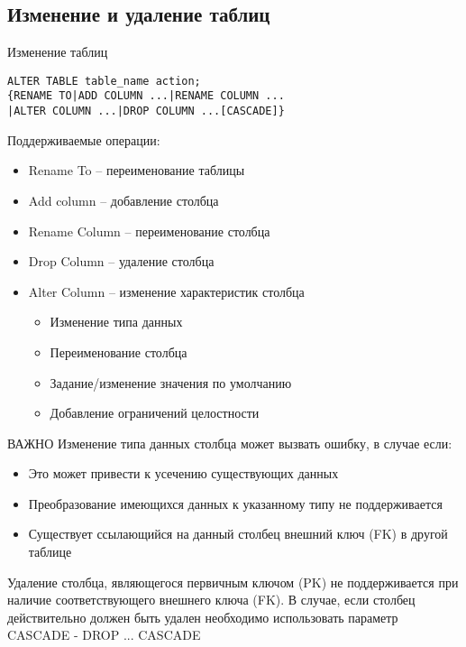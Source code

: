 \documentclass[12pt]{article}
\begin{document}
\newpage 

\subsection{Изменение и удаление таблиц}

\begin{nota}{Изменение таблиц}
\begin{lstlisting}
ALTER TABLE table_name action;
{RENAME TO|ADD COLUMN ...|RENAME COLUMN ...
|ALTER COLUMN ...|DROP COLUMN ...[CASCADE]}
\end{lstlisting}

    Поддерживаемые операции: 

    \begin{itemize}
        \item Rename To -- переименование таблицы
        \item Add column -- добавление столбца
        \item Rename Column -- переименование столбца
        \item Drop Column -- удаление столбца
        \item Alter Column -- изменение характеристик столбца 
        
        \begin{itemize}
            \item Изменение типа данных 
            \item Переименование столбца 
            \item Задание/изменение значения по умолчанию 
            \item Добавление ограничений целостности 
        \end{itemize}
    \end{itemize}
\end{nota}

\begin{Remark}{ВАЖНО}
    Изменение типа данных столбца может вызвать ошибку, в случае если:

    \begin{itemize}
        \item Это может привести к усечению существующих данных
        \item Преобразование имеющихся данных к указанному типу не поддерживается 
        \item Существует ссылающийся на данный столбец внешний ключ (FK) в другой таблице 
    \end{itemize}

    Удаление столбца, являющегося первичным ключом (PK) не поддерживается при наличие соответствующего внешнего ключа (FK). В случае, если столбец действительно должен быть удален необходимо использовать параметр CASCADE - DROP ... CASCADE 
\end{Remark}
\end{document}
